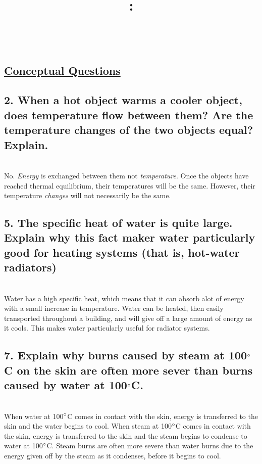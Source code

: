 \documentclass{article}
\title{
    \vspace{3in}
    \textmd{\textbf{\hmwkTitle :}}\\
    \vspace{0.5in}
    \textmd{\textbf{\hmwkClass}}\\
    \vspace{4in}
}
\author{\hmwkAuthorName}
\date{}
\begin{document}
\maketitle
\clearpage\shipout\null
\begin{center}
    \section*{\textbf{\underline {Conceptual Questions}}}
\end{center}

\subsection*{2. When a hot object warms a cooler object, does temperature flow between them? Are the temperature changes of the two objects equal? Explain.} \\

No. \textit{Energy} is exchanged between them not \textit {temperature}. Once the objects have reached thermal equilibrium, their temperatures will be the same. However, their temperature \textit{changes} will not necessarily be the same. 

\subsection*{5. The specific heat of water is quite large. Explain why this fact maker water particularly good for heating systems (that is, hot-water radiators)} \\

Water has a high specific heat, which means that it can absorb alot of energy with a small increase in temperature. Water can be heated, then easily transported throughout a building, and will give off a large amount of energy as it cools. This makes water particularly useful for radiator systems.

\subsection*{7. Explain why burns caused by steam at 100$\degree$C on the skin are often more sever than burns caused by water at 100$\degree$C.} \\

When water at 100$\degree$C comes in contact with the skin, energy is transferred to the skin and the water begins to cool. When steam at 100$\degree$C comes in contact with the skin, energy is transferred to the skin and the steam begins to condense to water at 100$\degree$C. Steam burns are often more severe than water burns due to the energy given off by the steam as it condenses, before it begins to cool.
\end{document}
